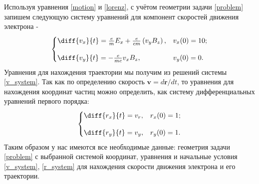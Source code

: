 \documentclass[a4paper]{article}
\begin{document}
Используя уравнения \eqref{motion} и \eqref{lorenz}, с учётом геометрии задачи \ref{problem} запишем следующую систему уравнений для компонент скоростей движения электрона - 
\begin{equation}\label{v_system}
\begin{cases}
\diff{v_x}{t} = \frac{e}{m}E_x + \frac{e}{cm}\left(v_yB_z\right),	& 	v_x(0) = 10 ; \\[10pt]
\diff{v_y}{t} = -\frac{e}{mc} v_x B_z,					&	v_y(0) = 0 . \\
\end{cases}
\end{equation}
Уравнения для нахождения траектории мы получим из решений системы \eqref{v_system}. Так как по определению \cite{Landau:mech} скорость $\mathbf{v} = d\mathbf{r}/dt$, то уравнения для нахождения координат частиц можно определить, как систему дифференциальных уравнений первого порядка:
\begin{equation}\label{r_system}
\begin{cases}
\diff{r_x}{t} = v_r, 	&	r_x(0) = 1 ;	\\[10pt]
\diff{r_y}{t} = v_y, 	&	r_y(0) = 1.	\\
\end{cases}
\end{equation}
Таким образом у нас имеются все необходимые данные: геометрия задачи \ref{problem} с выбранной системой координат, уравнения и начальные условия \eqref{v_system}, \eqref{r_system} для нахождения скорости движения электрона и его траектории.
\end{document}
